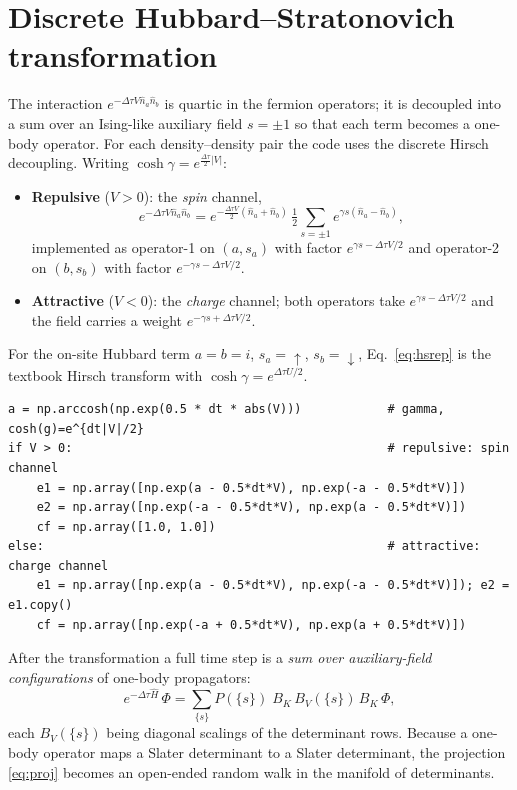 \documentclass[11pt]{article}
\newcommand{\dt}{\Delta\tau}
\begin{document}
\section{Discrete Hubbard--Stratonovich transformation}
The interaction $e^{-\dt V \hat n_a \hat n_b}$ is quartic in the fermion
operators; it is decoupled into a sum over an Ising-like auxiliary field
$s=\pm1$ so that each term becomes a one-body operator. For each density--density
pair the code uses the discrete Hirsch decoupling. Writing
$\cosh\gamma = e^{\frac{\dt}{2}|V|}$:
\begin{itemize}
\item \textbf{Repulsive} ($V>0$): the \emph{spin} channel,
\begin{equation}
e^{-\dt V \hat n_a\hat n_b}
= e^{-\frac{\dt V}{2}(\hat n_a+\hat n_b)}\,
\tfrac12\!\!\sum_{s=\pm1} e^{\gamma s(\hat n_a-\hat n_b)} ,
\label{eq:hsrep}
\end{equation}
implemented as operator-1 on $(a,s_a)$ with factor $e^{\gamma s-\dt V/2}$ and
operator-2 on $(b,s_b)$ with factor $e^{-\gamma s-\dt V/2}$.
\item \textbf{Attractive} ($V<0$): the \emph{charge} channel; both operators take
$e^{\gamma s-\dt V/2}$ and the field carries a weight $e^{-\gamma s+\dt V/2}$.
\end{itemize}
For the on-site Hubbard term $a=b=i$, $s_a=\uparrow$, $s_b=\downarrow$,
Eq.~\eqref{eq:hsrep} is the textbook Hirsch transform with
$\cosh\gamma=e^{\dt U/2}$.

\begin{lstlisting}[caption={Discrete HS factors (\texttt{LatticeModel.\_hs}).}]
a = np.arccosh(np.exp(0.5 * dt * abs(V)))            # gamma, cosh(g)=e^{dt|V|/2}
if V > 0:                                            # repulsive: spin channel
    e1 = np.array([np.exp(a - 0.5*dt*V), np.exp(-a - 0.5*dt*V)])
    e2 = np.array([np.exp(-a - 0.5*dt*V), np.exp(a - 0.5*dt*V)])
    cf = np.array([1.0, 1.0])
else:                                                # attractive: charge channel
    e1 = np.array([np.exp(a - 0.5*dt*V), np.exp(-a - 0.5*dt*V)]); e2 = e1.copy()
    cf = np.array([np.exp(-a + 0.5*dt*V), np.exp(a + 0.5*dt*V)])
\end{lstlisting}

After the transformation a full time step is a \emph{sum over auxiliary-field
configurations} of one-body propagators:
\begin{equation}
e^{-\dt \hat H}\,\Phi
= \sum_{\{s\}} P(\{s\})\; B_K\, B_V(\{s\})\, B_K\,\Phi,
\label{eq:walk}
\end{equation}
each $B_V(\{s\})$ being diagonal scalings of the determinant rows. Because a
one-body operator maps a Slater determinant to a Slater determinant, the
projection \eqref{eq:proj} becomes an open-ended random walk in the manifold of
determinants.
\end{document}
